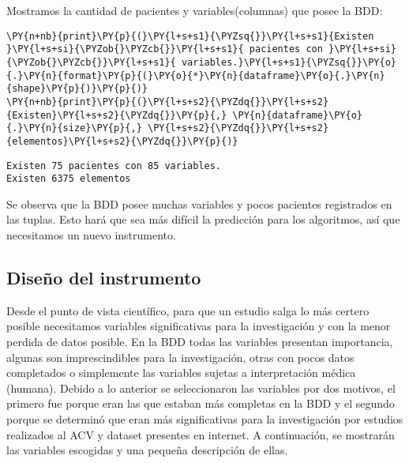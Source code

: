     Mostramos la cantidad de pacientes y variables(columnas) que posee la
BDD:

    \begin{tcolorbox}[breakable, size=fbox, boxrule=1pt, pad at break*=1mm,colback=cellbackground, colframe=cellborder]
\begin{Verbatim}[commandchars=\\\{\}]
\PY{n+nb}{print}\PY{p}{(}\PY{l+s+s1}{\PYZsq{}}\PY{l+s+s1}{Existen }\PY{l+s+si}{\PYZob{}\PYZcb{}}\PY{l+s+s1}{ pacientes con }\PY{l+s+si}{\PYZob{}\PYZcb{}}\PY{l+s+s1}{ variables.}\PY{l+s+s1}{\PYZsq{}}\PY{o}{.}\PY{n}{format}\PY{p}{(}\PY{o}{*}\PY{n}{dataframe}\PY{o}{.}\PY{n}{shape}\PY{p}{)}\PY{p}{)}
\PY{n+nb}{print}\PY{p}{(}\PY{l+s+s2}{\PYZdq{}}\PY{l+s+s2}{Existen}\PY{l+s+s2}{\PYZdq{}}\PY{p}{,} \PY{n}{dataframe}\PY{o}{.}\PY{n}{size}\PY{p}{,} \PY{l+s+s2}{\PYZdq{}}\PY{l+s+s2}{elementos}\PY{l+s+s2}{\PYZdq{}}\PY{p}{)}
\end{Verbatim}
\end{tcolorbox}

    \begin{Verbatim}[commandchars=\\\{\}]
Existen 75 pacientes con 85 variables.
Existen 6375 elementos
    \end{Verbatim}

    Se observa que la BDD posee muchas variables y pocos pacientes
registrados en las tuplas. Esto hará que sea más difícil la predicción
para los algoritmos, así que necesitamos un nuevo instrumento.

    \hypertarget{diseuxf1o-del-instrumento}{%
\subsection{Diseño del instrumento}\label{diseuxf1o-del-instrumento}}

Desde el punto de vista científico, para que un estudio salga lo más
certero posible necesitamos variables significativas para la
investigación y con la menor perdida de datos posible. En la BDD todas
las variables presentan importancia, algunas son imprescindibles para la
investigación, otras con pocos datos completados o simplemente las
variables sujetas a interpretación médica (humana). Debido a lo anterior
se seleccionaron las variables por dos motivos, el primero fue porque
eran las que estaban más completas en la BDD y el segundo porque se
determinó que eran más significativas para la investigación por estudios
realizados al ACV y dataset presentes en internet. A continuación, se
mostrarán las variables escogidas y una pequeña descripción de ellas.

